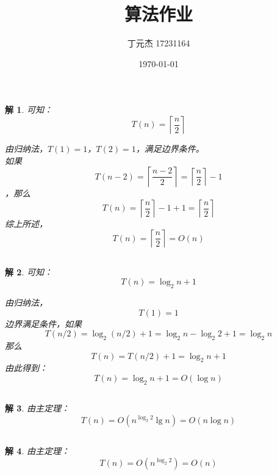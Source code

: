\documentclass[UTF8]{ctexart}
\title{算法作业}
\author{丁元杰 17231164}
\date{\today}
\newtheorem*{solution}{解}[section]
\begin{document}
\maketitle

\section{}
\subsection{}

\begin{solution}
    可知：
    $$T(n) = \left\lceil\frac{n}{2}\right\rceil$$

    由归纳法，$T(1) = 1$，$T(2) = 1$，满足边界条件。 \\
    如果
    $$T(n-2) = \left\lceil\frac{n-2}{2}\right\rceil = \left\lceil\frac{n}{2}\right\rceil - 1$$
    ，那么
    $$T(n) = \left\lceil\frac{n}{2}\right\rceil - 1 + 1 = \left\lceil\frac{n}{2}\right\rceil$$
    综上所述，$$T(n) = \left\lceil\frac{n}{2}\right\rceil = O(n)$$
\end{solution}

\subsection{}
\begin{solution}
    可知：
    $$T(n) = \log_{2}{n} + 1$$

    由归纳法，
    $$T(1) = 1$$
    边界满足条件，如果
    $$T(n/2)=\log_{2}{(n/2)} + 1 = \log_{2}{n} - \log_{2}{2} + 1 = \log_{2}{n} $$
    那么
    $$T(n) = T(n/2) + 1 = \log_{2}{n} + 1$$
    由此得到：
    $$T(n) = \log_{2}{n} + 1 = O(\log n)$$
    
\end{solution}

\subsection{}
\begin{solution}
    由主定理：
    $$T(n) = O(n^{\log_2{2}}\lg n) = O(n\log n)$$
\end{solution}

\subsection{}
\begin{solution}
    由主定理：
    $$T(n) = O(n^{\log_2{2}}) = O(n)$$
\end{solution}
\end{document}
